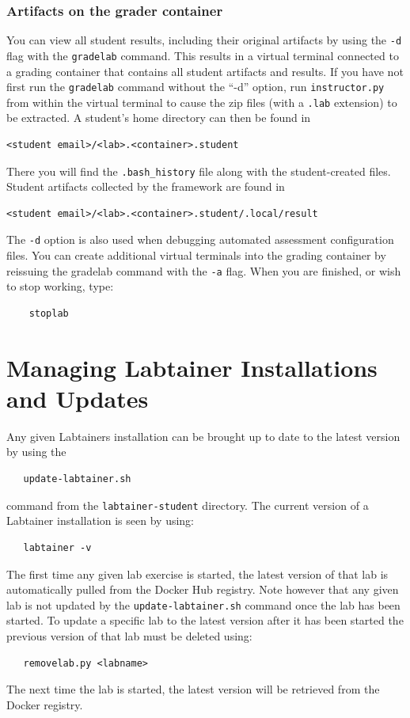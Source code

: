 \documentclass[12pt]{article}
\begin{document}
\subsubsection{Artifacts on the grader container}
You can view all student results, including their original artifacts by using the {\tt -d} flag
with the {\tt gradelab} command.  This results in a virtual terminal connected to a grading
container that contains all student artifacts and results.  If you have not first run the
{\tt gradelab} command without the ``-d'' option, run {\tt instructor.py} from within the
virtual terminal to cause the zip files (with a {\tt .lab} extension) to be extracted.  A student's home directory can
then be found in
\begin{verbatim}
<student email>/<lab>.<container>.student
\end{verbatim}
\noindent There you will find the {\tt .bash\_history} file along with the student-created files.
Student artifacts collected by the framework are found in 
\begin{verbatim}
<student email>/<lab>.<container>.student/.local/result
\end{verbatim}

\noindent The {\tt -d} option is also used when debugging automated assessment configuration
files.  You can create additional virtual terminals into the grading container by reissuing
the gradelab command with the {\tt -a} flag.  When you are finished, or wish to stop working, type:
\begin{verbatim}
    stoplab
\end{verbatim}


\section{Managing Labtainer Installations and Updates}
Any given Labtainers installation can be brought up to date to the latest version by using the
\begin{verbatim}
   update-labtainer.sh
\end{verbatim}
\noindent command from the {\tt labtainer-student} directory.  The current version of a Labtainer installation is seen by using:
\begin{verbatim}
   labtainer -v
\end{verbatim}
\noindent
The first time any given lab exercise is started, the latest version of that lab is automatically pulled from
the Docker Hub registry.
Note however that any given lab is not updated by the {\tt update-labtainer.sh} command once the lab has been started.  
To update a specific lab to the latest version after it has been started the previous version of that lab must be deleted
using:
\begin{verbatim}
   removelab.py <labname>
\end{verbatim}
\noindent The next time the lab is started, the latest version will be retrieved from the Docker registry.
\end{document}
